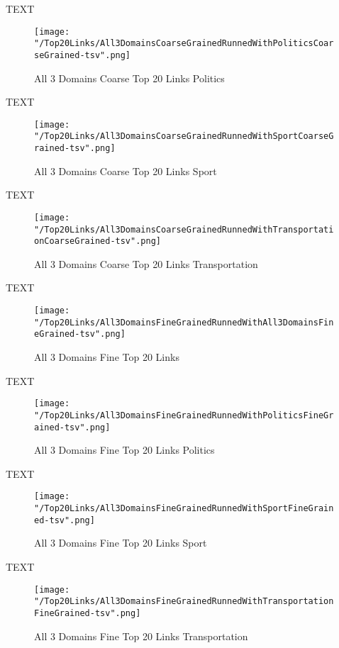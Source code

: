 \documentclass[thesis=M,english]{FITthesis}[2012/10/20]
\begin{document}
	TEXT

	\begin{figure}\centering
		\texttt{[image: "/Top20Links/All3DomainsCoarseGrainedRunnedWithPoliticsCoarseGrained-tsv".png]}
		\caption{All 3 Domains Coarse Top 20 Links Politics}\label{}
	\end{figure}	

	TEXT	

	\begin{figure}\centering
		\texttt{[image: "/Top20Links/All3DomainsCoarseGrainedRunnedWithSportCoarseGrained-tsv".png]}
		\caption{All 3 Domains Coarse Top 20 Links Sport}\label{}
	\end{figure}
	
		TEXT	

	\begin{figure}\centering
		\texttt{[image: "/Top20Links/All3DomainsCoarseGrainedRunnedWithTransportationCoarseGrained-tsv".png]}
		\caption{All 3 Domains Coarse Top 20 Links Transportation}\label{}	
	\end{figure}
		
		TEXT	

	\begin{figure}\centering
		\texttt{[image: "/Top20Links/All3DomainsFineGrainedRunnedWithAll3DomainsFineGrained-tsv".png]}
		\caption{All 3 Domains Fine Top 20 Links }\label{}	
	\end{figure}
	
	TEXT

	\begin{figure}\centering
		\texttt{[image: "/Top20Links/All3DomainsFineGrainedRunnedWithPoliticsFineGrained-tsv".png]}
		\caption{All 3 Domains Fine Top 20 Links Politics}\label{}
	\end{figure}	

	TEXT	

	\begin{figure}\centering
		\texttt{[image: "/Top20Links/All3DomainsFineGrainedRunnedWithSportFineGrained-tsv".png]}
		\caption{All 3 Domains Fine Top 20 Links Sport}\label{}
	\end{figure}
	
		TEXT	

	\begin{figure}\centering
		\texttt{[image: "/Top20Links/All3DomainsFineGrainedRunnedWithTransportationFineGrained-tsv".png]}
		\caption{All 3 Domains Fine Top 20 Links Transportation}\label{}	
	\end{figure}
	
\end{document}

